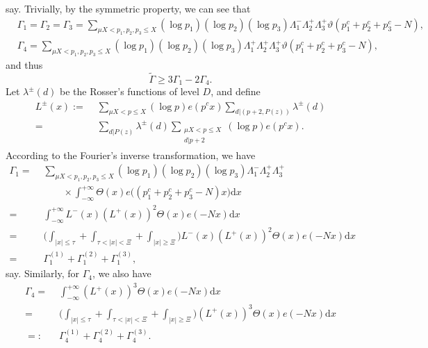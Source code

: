 \documentclass[a4paper,oneside,11pt]{article}%
\numberwithin{equation}{section}
\begin{document}
say. Trivially, by the symmetric property, we can see that
\begin{align*}
 & \Gamma_1=\Gamma_2=\Gamma_3=\sum_{\mu X<p_1,p_2,p_3\leqslant X}(\log p_1)(\log p_2)(\log p_3)
            \Lambda_1^-\Lambda_2^+\Lambda_3^+ \vartheta(p_1^c+p_2^c+p_3^c-N),
                \nonumber \\
 & \Gamma_4=\sum_{\mu X<p_1,p_2,p_3\leqslant X}(\log p_1)(\log p_2)(\log p_3)
            \Lambda_1^+\Lambda_2^+\Lambda_3^+ \vartheta(p_1^c+p_2^c+p_3^c-N),
\end{align*}
and thus
\begin{equation}\label{Gamma-tidle-lower-1}
  \widetilde{\Gamma}\geqslant3\Gamma_1-2\Gamma_4.
\end{equation}
Let $\lambda^\pm(d)$ be the Rosser's functions of level $D$, and define
\begin{align*}
  L^\pm(x):= & \,\, \sum_{\mu X<p\leqslant X}(\log p)e(p^cx)\sum_{d|(p+2,P(z))}\lambda^\pm(d)
               \nonumber \\
           = & \,\, \sum_{d|P(z)}\lambda^\pm(d) \sum_{\substack{\mu X<p\leqslant X\\ d|p+2}}(\log p)e(p^cx).
\end{align*}
According to the Fourier's inverse transformation, we have
\begin{align}\label{Gamma_1-decom}
 \Gamma_1 = & \,\,\sum_{\mu X<p_1,p_2,p_3\leqslant X}(\log p_1)(\log p_2)(\log p_3)\Lambda_1^-\Lambda_2^+\Lambda_3^+
                \nonumber \\
 & \,\, \qquad\times \int_{-\infty}^{+\infty}\Theta(x)e\big((p_1^c+p_2^c+p_3^c-N)x\big)\mathrm{d}x
                \nonumber \\
 = & \,\, \int_{-\infty}^{+\infty}L^-(x)(L^+(x))^2\Theta(x)e(-Nx)\mathrm{d}x
                \nonumber \\
 = & \,\, \bigg(\int_{|x|\leqslant\tau}+\int_{\tau<|x|<\Xi}+\int_{|x|\geqslant\Xi}\bigg)
           L^-(x)(L^+(x))^2\Theta(x)e(-Nx)\mathrm{d}x
                \nonumber \\
 = & \,\, \Gamma_1^{(1)}+\Gamma_1^{(2)}+\Gamma_1^{(3)},
\end{align}
say. Similarly, for $\Gamma_4$, we also have
\begin{align}\label{Gamma_4-decom}
          \Gamma_4
 = & \,\, \int_{-\infty}^{+\infty}(L^+(x))^3\Theta(x)e(-Nx)\mathrm{d}x
                \nonumber \\
 = & \,\, \bigg(\int_{|x|\leqslant\tau}+\int_{\tau<|x|<\Xi}+\int_{|x|\geqslant\Xi}\bigg)(L^+(x))^3\Theta(x)e(-Nx)\mathrm{d}x
                \nonumber \\
 =: & \,\, \Gamma_4^{(1)}+\Gamma_4^{(2)}+\Gamma_4^{(3)}.
\end{align}
\end{document}
